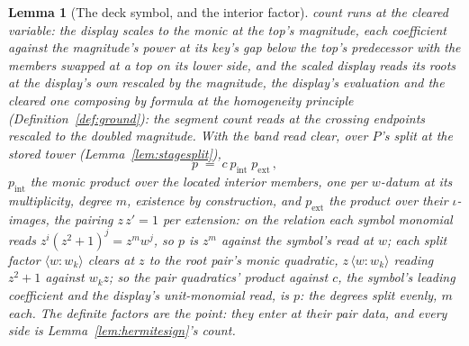 \documentclass[11pt]{article}
\newtheorem{lemma}{Lemma}
\theoremstyle{definition}
\begin{document}
\begin{lemma}[The deck symbol, and the interior factor]
count runs at the \emph{cleared variable}: the display scales to
the monic at the top's magnitude, each coefficient against the
magnitude's power at its key's gap below the top's predecessor
with the members swapped at a top on its lower side, and the
scaled display reads its roots at the display's own rescaled by
the magnitude, the display's evaluation and the cleared one
composing by formula at the homogeneity principle
(Definition~\ref{def:ground}): the segment count reads at the
crossing endpoints rescaled to the doubled magnitude. With the
band read clear, over $P$'s
split at the stored tower (Lemma~\ref{lem:stagesplit}),
\[
p\;=\;c\ p_{\mathrm{int}}\;p_{\mathrm{ext}}\,,
\]
$p_{\mathrm{int}}$ the monic product over the located interior
members, one per $w$-datum at its multiplicity, degree $m$,
existence by construction, and $p_{\mathrm{ext}}$ the product over
their $\iota$-images, the pairing $z\,z'=1$ per extension: on the
relation each symbol monomial reads $z^i(z^2+1)^j=z^m w^j$, so $p$ is
$z^m$ against the symbol's read at $w$; each split factor
$\langle w\!:\!w_k\rangle$ clears at $z$ to the root pair's
monic quadratic, $z\,\langle w\!:\!w_k\rangle$ reading $z^2+1$
against $w_kz$; so the pair quadratics' product against $c$, the
symbol's leading coefficient and the display's unit-monomial read, is
$p$: the degrees split evenly, $m$ each.
The definite factors are the point: they enter
at their pair data, and every side is Lemma~\ref{lem:hermitesign}'s
count.

\end{lemma}
\end{document}
